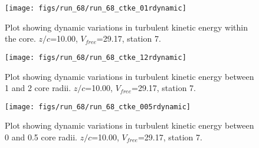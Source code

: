 \begin{figure}[H]
\centering
\texttt{[image: figs/run\_68/run\_68\_ctke\_01rdynamic]}
\caption{Plot showing dynamic variations in turbulent kinetic energy within the core. $z/c$=10.00, $V_{free}$=29.17, station 7.}
\end{figure}


\begin{figure}[H]
\centering
\texttt{[image: figs/run\_68/run\_68\_ctke\_12rdynamic]}
\caption{Plot showing dynamic variations in turbulent kinetic energy between 1 and 2 core radii. $z/c$=10.00, $V_{free}$=29.17, station 7.}
\end{figure}


\begin{figure}[H]
\centering
\texttt{[image: figs/run\_68/run\_68\_ctke\_005rdynamic]}
\caption{Plot showing dynamic variations in turbulent kinetic energy between 0 and 0.5 core radii. $z/c$=10.00, $V_{free}$=29.17, station 7.}
\end{figure}


